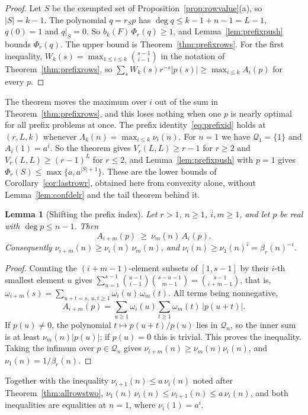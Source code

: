 \documentclass[11pt]{article}
\newtheorem{lemma}[theorem]{Lemma}
\begin{document}
\begin{proof}
Let $S$ be the exempted set of Proposition~\ref{prop:rowvalue}(a), so
$|S|=k-1$.  The polynomial $q=r_Sp$ has $\deg q\le k-1+n-1=L-1$, $q(0)=1$
and $q|_S=0$.  So $b_k(F)\,\Phi_r(q)\ge1$, and Lemma~\ref{lem:prefixpush}
bounds $\Phi_r(q)$.  The upper bound is Theorem~\ref{thm:prefixrows}.  For
the first inequality, $W_k(s)=\max_{1\le i\le k}\binom{s-1}{i-1}$ in the
notation of Theorem~\ref{thm:prefixrows}, so
$\sum_sW_k(s)r^{-s}|p(s)|\ge\max_{i\le k}A_i(p)$ for every $p$.
\end{proof}

The theorem moves the maximum over $i$ out of the sum in
Theorem~\ref{thm:prefixrows}, and this loses nothing when one $p$ is nearly
optimal for all prefix problems at once.  The prefix identity~\eqref{eq:prefixid} holds at $(r,L,k)$ whenever
$\Lambda_k(n)=\max_{i\le k}\nu_i(n)$.  For $n=1$ we have
$\mathcal Q_1=\{1\}$ and $A_i(1)=a^i$.  So the theorem gives
$V_r(L,L)\ge r-1$ for $r\ge2$ and $V_r(L,L)\ge(r-1)^L$ for $r\le2$, and
Lemma~\ref{lem:prefixpush} with $p=1$ gives $\Phi_r(S)\le\max\{a,a^{|S|+1}\}$.
These are the lower bounds of Corollary~\ref{cor:lastrowr}, obtained here
from convexity alone, without Lemma~\ref{lem:confdelr} and the tail theorem
behind it.

\begin{lemma}[Shifting the prefix index]\label{lem:prefixshift}
Let $r>1$, $n\ge1$, $i,m\ge1$, and let $p$ be real with $\deg p\le n-1$.
Then
\[
  A_{i+m}(p)\ \ge\ \nu_m(n)\,A_i(p).
\]
Consequently $\nu_{i+m}(n)\ge\nu_i(n)\,\nu_m(n)$, and
$\nu_i(n)\ge\nu_1(n)^i=\beta_r(n)^{-i}$.
\end{lemma}

\begin{proof}
Counting the $(i+m-1)$-element subsets of $[1,s-1]$ by their $i$-th
smallest element $u$ gives
$\sum_{u=1}^{s-1}\binom{u-1}{i-1}\binom{s-u-1}{m-1}=\binom{s-1}{i+m-1}$, that is,
$\omega_{i+m}(s)=\sum_{u+t=s,\ u,t\ge1}\omega_i(u)\,\omega_m(t)$.  All terms
being nonnegative,
\[
  A_{i+m}(p)=\sum_{u\ge1}\omega_i(u)\sum_{t\ge1}\omega_m(t)\,|p(u+t)| .
\]
If $p(u)\ne0$, the polynomial $t\mapsto p(u+t)/p(u)$ lies in $\mathcal Q_n$,
so the inner sum is at least $\nu_m(n)|p(u)|$; if $p(u)=0$ this is trivial.
This proves the inequality.  Taking the infimum over $p\in\mathcal Q_n$
gives $\nu_{i+m}(n)\ge\nu_m(n)\nu_i(n)$, and $\nu_1(n)=1/\beta_r(n)$.
\end{proof}

Together with the inequality $\nu_{i+1}(n)\le a\,\nu_i(n)$ noted after
Theorem~\ref{thm:allrowstwo},
$\nu_1(n)\,\nu_i(n)\le\nu_{i+1}(n)\le a\,\nu_i(n)$, and both inequalities are
equalities at $n=1$, where $\nu_i(1)=a^i$.
\end{document}
